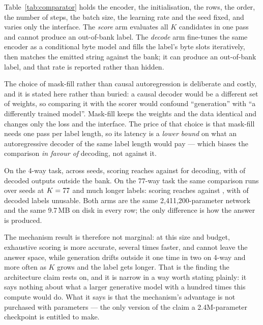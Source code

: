 Table~\ref{tab:comparator} holds the encoder, the initialisation, the rows, the
order, the number of steps, the batch size, the learning rate and the seed
fixed, and varies only the interface. The \emph{score} arm evaluates all $K$
candidates in one pass and cannot produce an out-of-bank label. The
\emph{decode} arm fine-tunes the same encoder as a conditional byte model and
fills the label's byte slots iteratively, then matches the emitted string
against the bank; it can produce an out-of-bank label, and that rate is
reported rather than hidden.

The choice of mask-fill rather than causal autoregression is deliberate and
costly, and it is stated here rather than buried: a causal decoder would be a
different set of weights, so comparing it with the scorer would confound
``generation'' with ``a differently trained model''. Mask-fill keeps the
weights and the data identical and changes only the loss and the interface.
The price of that choice is that mask-fill needs one pass per label length, so
its latency is a \emph{lower bound} on what an autoregressive decoder of the
same label length would pay --- which biases the comparison \emph{in favour of}
decoding, not against it.



On the 4-way task, across \CmpNewsSeeds{} seeds, scoring reaches
\CmpNewsScore{} against \CmpNewsDecode{} for decoding, with \CmpNewsInvalid{}
of decoded outputs outside the bank. On the 77-way task the same comparison
runs over \CmpBankSeeds{} seeds at $K=77$ and much longer labels:
scoring reaches \CmpBankScore{} against \CmpBankDecode{}, with
\CmpBankInvalid{} of decoded labels unusable. Both arms are the same
2,411,200-parameter network and the same 9.7\,MB on disk in every row; the only
difference is how the answer is produced.

The mechanism result is therefore not marginal: at this size and budget,
exhaustive scoring is more accurate, several times faster, and cannot leave the
answer space, while generation drifts outside it one time in two on 4-way and
more often as $K$ grows and the label gets longer. That is the finding the
architecture claim rests on, and it is narrow in a way worth stating plainly:
it says nothing about what a larger generative model with a hundred times this
compute would do. What it says is that the mechanism's advantage is not
purchased with parameters --- the only version of the claim a 2.4M-parameter
checkpoint is entitled to make.

